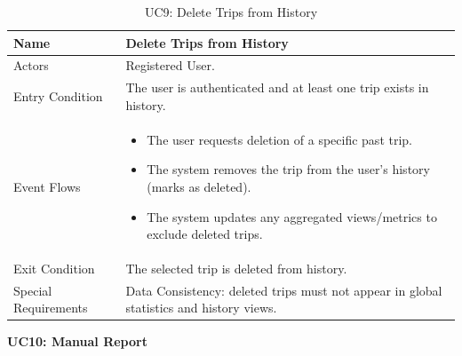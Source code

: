 \begin{table}[H]
    \centering
    \renewcommand{\arraystretch}{1.3}
    \begin{tabular}{|p{}|p{}|}
        \hline
        Name & \textbf{Delete Trips from History} \\
        \hline
        Actors & Registered User. \\
        \hline
        Entry Condition & The user is authenticated and at least one trip exists in history. \\
        \hline
        Event Flows & \begin{itemize}[topsep=0pt, partopsep=0pt, leftmargin=*]
            \item The user requests deletion of a specific past trip.
            \item The system removes the trip from the user’s history (marks as deleted).
            \item The system updates any aggregated views/metrics to exclude deleted trips.
        \end{itemize} \\
        \hline
        Exit Condition & The selected trip is deleted from history. \\
        \hline
        Special Requirements & Data Consistency: deleted trips must not appear in global statistics and history views. \\
        \hline
    \end{tabular}
    \caption{UC9: Delete Trips from History}
    \label{uc9}
\end{table}

\newpage
\noindent
\textbf{UC10: Manual Report}

